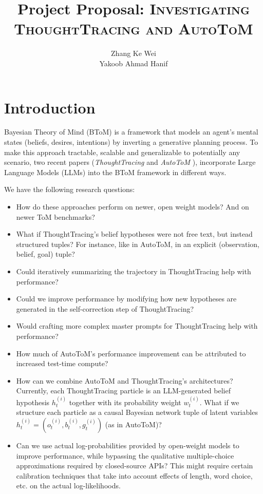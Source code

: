 \documentclass[11pt]{article}
\title{\vspace{-1.5em}Project Proposal: \textsc{Investigating ThoughtTracing and AutoToM}}
\author{
  Zhang Ke Wei \\
  Yakoob Ahmad Hanif \\
}
\date{\vspace{-0.5em}}
\begin{document}
\maketitle
\vspace{-2em}

\section{Introduction}

Bayesian Theory of Mind (BToM) is a framework that models an agent's mental states (beliefs, desires, intentions) by inverting a generative planning process. To make this approach tractable, scalable and generalizable to potentially any scenario, two recent papers (\textit{ThoughtTracing} \citep{kim2025hypothesisdriventheoryofmindreasoninglarge}
and \textit{AutoToM} \citep{zhang2026autotomscalingmodelbasedmental}), incorporate Large Language Models (LLMs) into the BToM framework in different ways. 

We have the following research questions:

\begin{itemize}
    \item How do these approaches perform on newer, open weight models? And on newer ToM benchmarks?
    \item What if ThoughtTracing's belief hypotheses were not free text, but instead structured tuples? For instance, like in AutoToM, in an explicit (observation, belief, goal) tuple?
    \item Could iteratively summarizing the trajectory in ThoughtTracing help with performance? 
    \item Could we improve performance by modifying how new hypotheses are generated in the self-correction step of ThoughtTracing?
    \item Would crafting more complex master prompts for ThoughtTracing help with performance?
    \item How much of AutoToM's performance improvement can be attributed to increased test-time compute?
    \item How can we combine AutoToM and ThoughtTracing's architectures? Currently, each ThoughtTracing particle is an LLM-generated belief hypothesis $h_t^{(i)}$ together with its probability weight $w_t^{(i)}$. What if we structure each particle as a causal Bayesian network tuple of latent variables $h_t^{(i)} = (o_t^{(i)}, b_t^{(i)}, g_t^{(i)})$ (as in AutoToM)?
    \item Can we use actual log-probabilities provided by open-weight models to improve performance, while bypassing the qualitative multiple-choice approximations required by closed-source APIs? This might require certain calibration techniques that take into account effects of length, word choice, etc. on the actual log-likelihoods.
\end{itemize}
\end{document}
